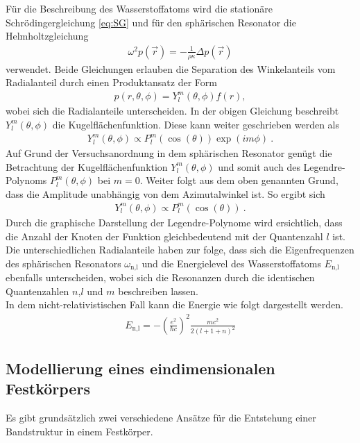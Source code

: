 Für die Beschreibung des Wasserstoffatoms wird die stationäre Schrödingergleichung \ref{eq:SG} und für den sphärischen Resonator die Helmholtzgleichung
\begin{align}
  \omega^2 p(\vec{r}) = - \frac{1}{\rho \kappa} \Delta p(\vec{r})
  \label{eq:Hemholtz}
\end{align}
verwendet. Beide Gleichungen erlauben die Separation des Winkelanteils vom Radialanteil durch einen Produktansatz der Form
\begin{align}
  p(r,\theta,\phi) = Y^{m}_{l}(\theta, \phi) f(r),
  \label{eq:Sepearation}
\end{align}
 wobei sich die Radialanteile unterscheiden. In der obigen Gleichung beschreibt $ Y^{m}_{l}(\theta, \phi)$ die Kugelflächenfunktion. Diese kann weiter geschrieben werden als
 \begin{align}
    Y^{m}_{l}(\theta, \phi) \propto  P^{m}_{l}(\cos{(\theta)}) \exp{(im\phi)} \:.
    \label{eq:Kugelflfkt}
 \end{align}
Auf Grund der Versuchsanordnung in dem sphärischen Resonator genügt die Betrachtung der Kugelflächenfunktion  $Y^{m}_{l}(\theta, \phi)$ und somit auch des Legendre-Polynoms $ P^{m}_{l}(\theta, \phi)$ bei $m=0$. Weiter folgt aus dem oben genannten Grund, dass die Amplitude unabhängig von dem Azimutalwinkel ist. So ergibt sich
\begin{align}
    Y^{m}_{l}(\theta, \phi) \propto  P^{m}_{l}(\cos{(\theta)}) \:.
    \label{eq:Kugelflfkt2}
\end{align}
Durch die graphische Darstellung der Legendre-Polynome wird ersichtlich, dass die Anzahl der Knoten der Funktion gleichbedeutend mit der Quantenzahl $l$ ist.
\\
Die unterschiedlichen Radialanteile haben zur folge, dass sich die Eigenfrequenzen des sphärischen Resonators $\omega_\textrm{n,l}$ und die Energielevel des Wasserstoffatoms $E_\textrm{n,l}$ ebenfalls unterscheiden, wobei sich die Resonanzen durch die identischen Quantenzahlen $n$,$l$ und $m$ beschreiben lassen.\\
In dem nicht-relativistischen Fall kann die Energie wie folgt dargestellt werden.
\begin{align}
  E_\textrm{n,l} = -\left(\frac{e^2}{\hbar c} \right)^2 \frac{mc^2}{2(l+1+n)^2}
  \label{eq:Energie}
\end{align}
%
\subsection{Modellierung eines eindimensionalen Festkörpers}
\label{sec:Modellierung eines eindimensionalen Festkörpers}
Es gibt grundsätzlich zwei verschiedene Ansätze für die Entstehung einer Bandstruktur in einem Festkörper.

